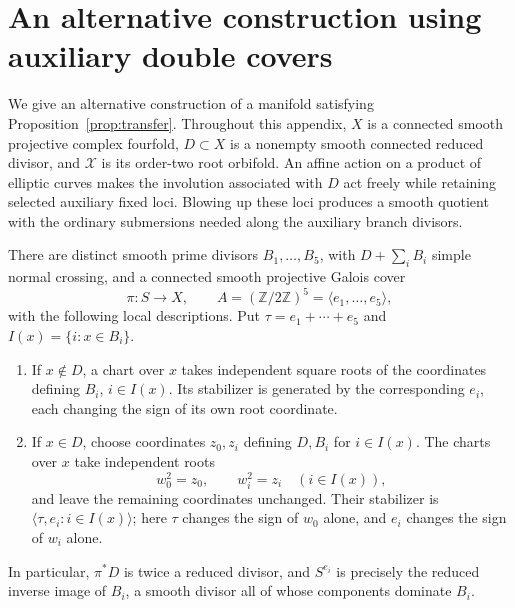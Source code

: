 \section{An alternative construction using auxiliary double covers}
\label{app:branched}

We give an alternative construction of a manifold satisfying
Proposition~\ref{prop:transfer}.  Throughout this appendix, $X$ is a
connected smooth projective complex fourfold, $D\subset X$ is a nonempty
smooth connected reduced divisor, and $\mathcal X$ is its order-two root
orbifold. An affine action on a product of elliptic curves makes the
involution associated with $D$ act freely while retaining selected auxiliary fixed
loci. Blowing up these loci produces a smooth quotient with the ordinary
submersions needed along the auxiliary branch divisors.

\begin{lemma}
\label{lem:branched-cover}
There are distinct smooth prime divisors $B_1,\ldots,B_5$, with
$D+\sum_i B_i$ simple normal crossing, and a connected smooth projective
Galois cover
\[
 \pi:S\longrightarrow X,\qquad
 A=(\mathbb Z/2\mathbb Z)^5=\langle e_1,\ldots,e_5\rangle,
\]
with the following local descriptions.  Put $\tau=e_1+\cdots+e_5$ and
$I(x)=\{i:x\in B_i\}$.
\begin{enumerate}
\item If $x\notin D$, a chart over $x$ takes independent square roots of
the coordinates defining $B_i$, $i\in I(x)$.  Its stabilizer is generated
by the corresponding $e_i$, each changing the sign of its own root
coordinate.
\item If $x\in D$, choose coordinates $z_0,z_i$ defining $D,B_i$ for
$i\in I(x)$.  The charts over $x$ take independent roots
\[
 w_0^2=z_0,\qquad w_i^2=z_i\quad(i\in I(x)),
\]
and leave the remaining coordinates unchanged.  Their stabilizer is
$\langle\tau,e_i:i\in I(x)\rangle$; here $\tau$ changes the sign of
$w_0$ alone, and $e_i$ changes the sign of $w_i$ alone.
\end{enumerate}
In particular, $\pi^*D$ is twice a reduced divisor, and
$S^{e_i}$ is precisely the reduced inverse image of $B_i$, a smooth
divisor all of whose components dominate $B_i$.
\end{lemma}

